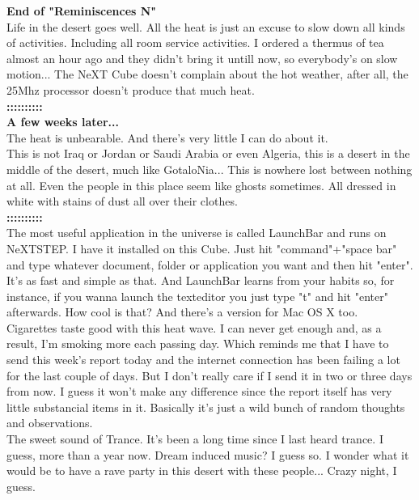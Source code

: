 \documentclass[11pt,twoside,a4paper]{book}
\begin{document}
\begin{multicols*}{2}
\textbf{End of "Reminiscences N"} ~\\

Life in the desert goes well. All the heat is just an excuse to slow down all kinds of activities. Including all room service activities. I ordered a thermus of tea almost an hour ago and they didn't bring it untill now, so everybody's on slow motion... The NeXT Cube doesn't complain about the hot weather, after all, the 25Mhz processor doesn't produce that much heat. ~\\

\textbf{ {\small ::::::::::} } ~\\
\textbf{A few weeks later...} ~\\

The heat is unbearable. And there's very little I can do about it. ~\\

This is not Iraq or Jordan or Saudi Arabia or even Algeria, this is a desert in the middle of the desert, much like GotaloNia... This is nowhere lost between nothing at all. Even the people in this place seem like ghosts sometimes. All dressed in white with stains of dust all over their clothes. ~\\
\textbf{ {\small ::::::::::} } ~\\

The most useful application in the universe is called LaunchBar and runs on NeXTSTEP. I have it installed on this Cube. Just hit "command"+"space bar" and type whatever document, folder or application you want and then hit "enter". It's as fast and simple as that. And LaunchBar learns from your habits so, for instance, if you wanna launch the texteditor you just type "t" and hit "enter" afterwards. How cool is that? And there's a version for Mac OS X too. ~\\

Cigarettes taste good with this heat wave. I can never get enough and, as a result, I'm smoking more each passing day. Which reminds me that I have to send this week's report today and the internet connection has been failing a lot for the last couple of days. But I don't really care if I send it in two or three days from now. I guess it won't make any difference since the report itself has very little substancial items in it. Basically it's just a wild bunch of random thoughts and observations. ~\\

The sweet sound of Trance. It's been a long time since I last heard trance. I guess, more than a year now. Dream induced music? I guess so. I wonder what it would be to have a rave party in this desert with these people... Crazy night, I guess. ~\\


\end{multicols*}
\end{document}
